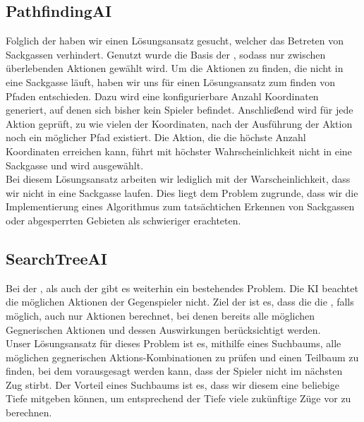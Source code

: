 \subsection{PathfindingAI}
\label{sec:pathfinding-ai}

Folglich der  haben wir einen Lösungsansatz gesucht, welcher das Betreten von Sackgassen
verhindert.
Genutzt wurde die Basis der , sodass nur zwischen überlebenden Aktionen gewählt wird.
Um die Aktionen zu finden, die nicht in eine Sackgasse läuft, haben wir uns für einen Lösungsansatz zum finden von
Pfaden entschieden.
Dazu wird eine konfigurierbare Anzahl Koordinaten generiert, auf denen sich bisher kein Spieler befindet.
Anschließend wird für jede Aktion geprüft, zu wie vielen der Koordinaten, nach der Ausführung der Aktion noch ein
möglicher Pfad existiert. 
Die Aktion, die die höchste Anzahl Koordinaten erreichen kann, führt mit höchster Wahrscheinlichkeit
nicht in eine Sackgasse und wird ausgewählt. \\

Bei diesem Lösungsansatz arbeiten wir lediglich mit der Warscheinlichkeit, dass wir nicht in eine Sackgasse laufen.
Dies liegt dem Problem zugrunde, dass wir die Implementierung eines Algorithmus zum tatsächtichen Erkennen von
Sackgassen oder abgesperrten Gebieten als schwieriger erachteten.


\subsection{SearchTreeAI}
\label{sec:searchtree-ai}

Bei der , als auch der  gibt es weiterhin ein bestehendes
Problem.
Die \acs{KI} beachtet die möglichen Aktionen der Gegenspieler nicht.
Ziel der  ist es, dass die die , falls möglich, auch nur Aktionen berechnet,
bei denen bereits alle möglichen Gegnerischen Aktionen und dessen Auswirkungen berücksichtigt werden. \\

Unser Lösungsansatz für dieses Problem ist es, mithilfe eines Suchbaums, alle möglichen gegnerischen
Aktions-Kombinationen zu prüfen und einen Teilbaum zu finden, bei dem vorausgesagt werden kann, dass
der Spieler nicht im nächsten Zug stirbt.
Der Vorteil eines Suchbaums ist es, dass wir diesem eine
beliebige Tiefe mitgeben können, um entsprechend der Tiefe viele zukünftige Züge vor zu berechnen.
